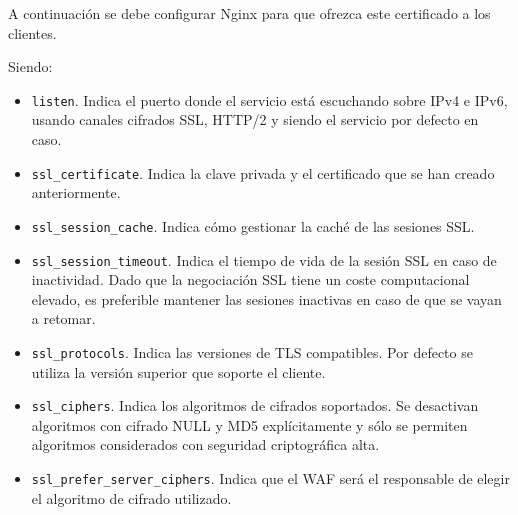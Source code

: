 \par A continuación se debe configurar Nginx para que ofrezca este certificado a los clientes.\\
\begin{minipage}{\linewidth}
  
\end{minipage}
\par Siendo:
\begin{itemize}
  \item \lstinline{listen}. Indica el puerto donde el servicio está escuchando sobre IPv4 e IPv6, usando canales cifrados SSL, HTTP/2 y siendo el servicio por defecto en caso.
  \item \lstinline{ssl_certificate}. Indica la clave privada y el certificado que se han creado anteriormente.
  \item \lstinline{ssl_session_cache}. Indica cómo gestionar la caché de las sesiones SSL.
  \item \lstinline{ssl_session_timeout}. Indica el tiempo de vida de la sesión SSL en caso de inactividad. Dado que la negociación SSL tiene un coste computacional elevado, es preferible mantener las sesiones inactivas en
    caso de que se vayan a retomar.
  \item \lstinline{ssl_protocols}. Indica las versiones de TLS compatibles. Por defecto se utiliza la versión superior que soporte el cliente.
  \item \lstinline{ssl_ciphers}. Indica los algoritmos de cifrados soportados. Se desactivan algoritmos con cifrado NULL y MD5 explícitamente y sólo se permiten algoritmos considerados con seguridad criptográfica alta.
  \item \lstinline{ssl_prefer_server_ciphers}. Indica que el WAF será el responsable de elegir el algoritmo de cifrado utilizado.
\end{itemize}


